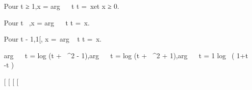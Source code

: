 Pour t ≥ 1,\quad x = arg~
\mathrmch~ t
\Leftrightarrow t =\
\mathrmch x\text et x ≥ 0.

Pour t \in {}~,\quad x = arg~
\mathrmsh~ t
\Leftrightarrow t =\
\mathrmsh x.

Pour t \in{]} - 1,1{[}, \quad x =\
arg \mathrmth~ t
\Leftrightarrow t =\
\mathrmth x.

arg~
\mathrmch~ t
= log (t + \sqrtt~^2
 - 1),\quad arg~
\mathrmsh~ t
= log (t + \sqrtt~^2
 + 1),\quad arg~
\mathrmth~ t = 1
\over 2  log~ ( 1+t
\over 1-t )

{[}
{[}
{[}
{[}
